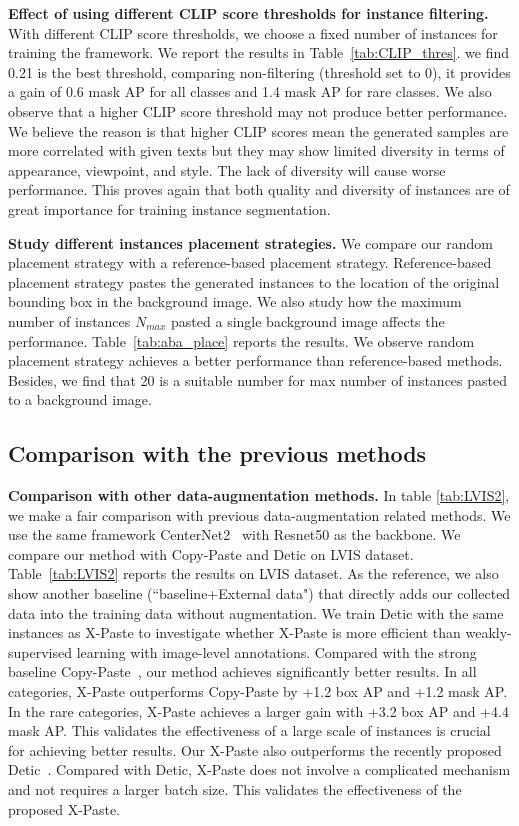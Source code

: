 \documentclass{article}
\begin{document}
\noindent \textbf{Effect of using different CLIP score thresholds for instance filtering. }
With different CLIP score thresholds, we choose a fixed number of instances for training the framework. We report the results in Table~\ref{tab:CLIP_thres}. we find 0.21 is the best threshold, comparing non-filtering (threshold set to 0), it provides a gain of 0.6 mask AP for all classes and 1.4 mask AP for rare classes. We also observe that a higher CLIP score threshold may not produce better performance. We believe the reason is that higher CLIP scores mean the generated samples are more correlated with given texts but they may show limited diversity in terms of appearance, viewpoint, and style. The lack of diversity will cause worse performance. This proves again that both quality and diversity of instances are of great importance for training instance segmentation.


\noindent \textbf{Study different instances placement strategies.} We compare our random placement strategy with a reference-based placement strategy. Reference-based placement strategy pastes the generated instances to the location of the original bounding box in the background image. We also study how the maximum number of instances $N_{max}$ pasted a single background image affects the performance. Table~\ref{tab:aba_place} reports the results. We observe random placement strategy achieves a better performance than reference-based methods. Besides, we find that 20 is a suitable number for max number of instances pasted to a background image. 


\subsection{Comparison with the previous methods}
\label{sec:comp}
\noindent \textbf{Comparison with other data-augmentation methods.}
In table \ref{tab:LVIS2}, we make a fair comparison with previous data-augmentation related methods. We use the same framework CenterNet2~\cite{CenterNet2} with Resnet50 as the backbone. We compare our method with Copy-Paste \cite{Simple-Copy-Paste} and Detic\cite{Detic} on LVIS dataset. Table~\ref{tab:LVIS2} reports the results on LVIS dataset. As the reference, we also show another baseline (``baseline+External data") that directly adds our collected data into the training data without augmentation. We train Detic with the same instances as X-Paste to investigate whether X-Paste is more efficient than weakly-supervised learning with image-level annotations. Compared with the strong baseline Copy-Paste~\cite{Simple-Copy-Paste}, our method achieves significantly better results. In all categories, X-Paste outperforms Copy-Paste by +1.2 box AP and +1.2 mask AP. In the rare categories, X-Paste achieves a larger gain with +3.2 box AP and +4.4 mask AP. This validates the effectiveness of a large scale of instances is crucial for achieving better results. Our X-Paste also outperforms the recently proposed Detic~\cite{Detic}. Compared with Detic, X-Paste does not involve a complicated mechanism and not requires a larger batch size. This validates the effectiveness of the proposed X-Paste.
\end{document}
